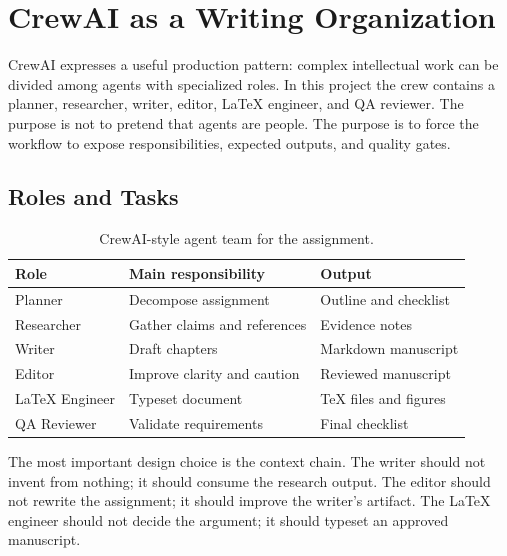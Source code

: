 \chapter{CrewAI as a Writing Organization}
CrewAI expresses a useful production pattern: complex intellectual work can be divided among agents with specialized roles. In this project the crew contains a planner, researcher, writer, editor, LaTeX engineer, and QA reviewer. The purpose is not to pretend that agents are people. The purpose is to force the workflow to expose responsibilities, expected outputs, and quality gates.

\section{Roles and Tasks}
\begin{table}[h]
\centering
\begin{tabular}{lll}
\toprule
Role & Main responsibility & Output \\
\midrule
Planner & Decompose assignment & Outline and checklist \\
Researcher & Gather claims and references & Evidence notes \\
Writer & Draft chapters & Markdown manuscript \\
Editor & Improve clarity and caution & Reviewed manuscript \\
LaTeX Engineer & Typeset document & TeX files and figures \\
QA Reviewer & Validate requirements & Final checklist \\
\bottomrule
\end{tabular}
\caption{CrewAI-style agent team for the assignment.}
\end{table}

The most important design choice is the context chain. The writer should not invent from nothing; it should consume the research output. The editor should not rewrite the assignment; it should improve the writer's artifact. The LaTeX engineer should not decide the argument; it should typeset an approved manuscript.
